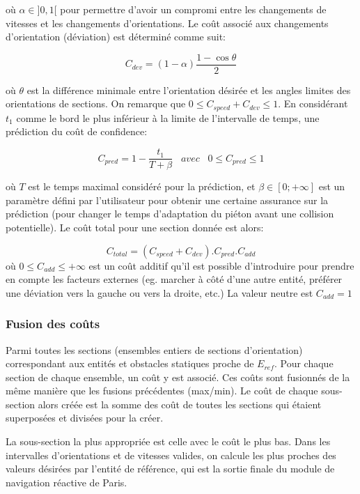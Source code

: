 \documentclass[11pt]{article}
\begin{document}
où $\alpha \in ]0,1[$ pour permettre d'avoir un compromi entre les changements de vitesses et les changements d'orientations. Le coût associé aux changements d'orientation (déviation) est déterminé comme suit:

\begin{equation}
C_{dev} = (1-\alpha) \frac{1 - \cos\theta}{2}
\end{equation}

où $\theta$ est la différence minimale entre l'orientation désirée et les angles limites des orientations de sections. On remarque que $0 \leq C_{speed} + C_{dev} \leq 1$. En considérant $t_1$ comme le bord le plus inférieur à la limite de l'intervalle de temps, une prédiction du coût  de confidence:

\begin{equation}
C_{pred} = 1 - \frac{t_1}{T + \beta} \;\;\; avec \;\;\; 0 \leq C_{pred} \leq 1
\end{equation}

où $T$ est le temps maximal considéré pour la prédiction, et $\beta \in [0;+\infty]$ est un paramètre défini par l'utilisateur pour obtenir une certaine assurance sur la prédiction (pour changer le temps d'adaptation du piéton avant une collision potentielle). Le coût total pour une section donnée est alors:

\begin{equation}
C_{total} = (C_{speed} + C_{dev}). C_{pred} . C_{add}
\end{equation} 
où  $0 \leq C_{add} \leq + \infty$ est un coût additif qu'il est possible d'introduire pour prendre en compte les facteurs externes (eg. marcher à côté d'une autre entité, préférer une déviation vers la gauche ou vers la droite, etc.) La valeur neutre est $C_{add} = 1$

\subsubsection*{Fusion des coûts}

Parmi toutes les sections (ensembles entiers de sections d'orientation) correspondant aux entités et obstacles statiques proche de $E_{ref}$. Pour chaque section de chaque ensemble, un coût y est associé. Ces coûts sont fusionnés de la même manière que les fusions précédentes (max/min). Le coût de chaque sous-section alors créée est la somme des coût de toutes les sections qui étaient superposées et divisées pour la créer.

La sous-section la plus appropriée est celle avec le coût le plus bas. Dans les intervalles d'orientations et de vitesses valides, on calcule les plus proches des valeurs désirées par l'entité de référence, qui est la sortie finale du module de navigation réactive de Paris.
\end{document}

